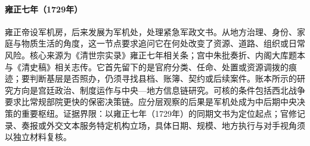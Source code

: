 \hypertarget{social:EQ-1729-JUNJICHU-FOUNDING}{}\paragraph{雍正七年（1729年）}雍正帝设军机房，后来发展为军机处，处理紧急军政文书。从地方治理、身份、家庭与物质生活的角度，这一节点要求追问它在何处改变了资源、道路、组织或日常风险。核心来源为《清世宗实录》雍正七年相关条；宫中朱批奏折、内阁大库题本与《清史稿》相关志传。它首先留下的是官府分类、任命、处置或资源调拨的痕迹；要判断基层是否照办，仍须寻找县档、账簿、契约或后续案件。账本所示的研究方向是宫廷政治、制度运作与中央—地方信息链研究。可核的条件包括西北战争要求比常规部院更快的保密决策链。应分层观察的后果是军机处成为中后期中央决策的重要枢纽。证据界限：以雍正七年（1729年）的同期文书为定位起点；官修记录、奏报或外交文本服务特定机构立场，具体日期、规模、地方执行与对手视角须以独立材料复核。
